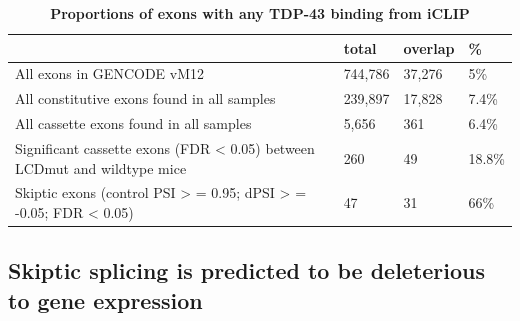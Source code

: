 \begin{table}
	\begin{footnotesize}
	\begin{tabular}{llll}
		& total &	overlap	& \% \\
		\hline
		All exons in GENCODE vM12 &	744,786	& 37,276 & 5\% \\
		All constitutive exons found in all samples	& 239,897	& 17,828	& 7.4\% \\
		All cassette exons found in all samples &	5,656 &	361	& 6.4\% \\
		Significant cassette exons (FDR < 0.05) between LCDmut and wildtype mice	& 260	& 49 & 18.8\% \\
		Skiptic exons (control PSI > = 0.95; dPSI > = -0.05; FDR < 0.05) & 47 &	31 & 66\% \\
	\end{tabular}
	\end{footnotesize}
	\caption{\textbf{Proportions of exons with any TDP-43 binding from iCLIP}}
	\label{tab:iclip_proportions}
\end{table}


\subsection{Skiptic splicing is predicted to be deleterious to gene expression}

